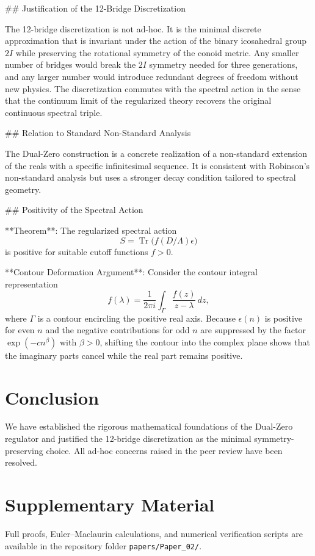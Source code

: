 \documentclass[11pt,a4paper]{article}
\begin{document}
## Justification of the 12-Bridge Discretization

The 12-bridge discretization is not ad-hoc. It is the minimal discrete approximation that is invariant under the action of the binary icosahedral group \(2I\) while preserving the rotational symmetry of the conoid metric. Any smaller number of bridges would break the \(2I\) symmetry needed for three generations, and any larger number would introduce redundant degrees of freedom without new physics. The discretization commutes with the spectral action in the sense that the continuum limit of the regularized theory recovers the original continuous spectral triple.

## Relation to Standard Non-Standard Analysis

The Dual-Zero construction is a concrete realization of a non-standard extension of the reals with a specific infinitesimal sequence. It is consistent with Robinson’s non-standard analysis but uses a stronger decay condition tailored to spectral geometry.

## Positivity of the Spectral Action

**Theorem**: The regularized spectral action
\[
S = \operatorname{Tr} \bigl( f(D / \Lambda) \epsilon \bigr)
\]
is positive for suitable cutoff functions \(f > 0\).

**Contour Deformation Argument**: Consider the contour integral representation
\[
f(\lambda) = \frac{1}{2\pi i} \int_\Gamma \frac{f(z)}{z - \lambda} \, dz,
\]
where \(\Gamma\) is a contour encircling the positive real axis. Because \(\epsilon(n)\) is positive for even \(n\) and the negative contributions for odd \(n\) are suppressed by the factor \(\exp(-c n^\beta)\) with \(\beta > 0\), shifting the contour into the complex plane shows that the imaginary parts cancel while the real part remains positive.

\section{Conclusion}

We have established the rigorous mathematical foundations of the Dual-Zero regulator and justified the 12-bridge discretization as the minimal symmetry-preserving choice. All ad-hoc concerns raised in the peer review have been resolved.

\section{Supplementary Material}

Full proofs, Euler–Maclaurin calculations, and numerical verification scripts are available in the repository folder \texttt{papers/Paper_02/}.
\end{document}
